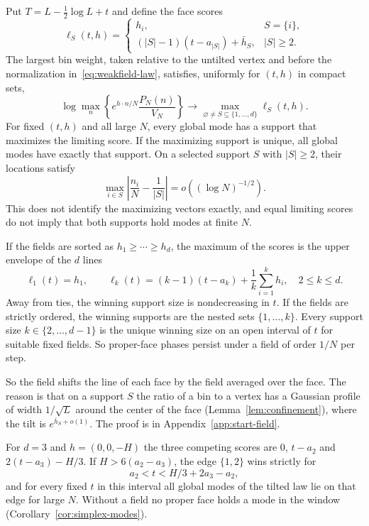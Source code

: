 \begin{theorem}\label{thm:weakfield-phases}
Put $T=L-\frac12\log L+t$ and define the face scores
\[
 \ell_S(t,h)=
 \begin{cases}
 h_i,& S=\{i\},\\
 (|S|-1)(t-a_{|S|})+\bar h_S,& |S|\ge2.
 \end{cases}
\]
The largest bin weight, taken relative to the untilted vertex and before the
normalization in~\eqref{eq:weakfield-law}, satisfies, uniformly for $(t,h)$ in
compact sets,
\begin{equation}\label{eq:weakfield-maximum}
 \log\max_n\left\{e^{h\cdot n/N}\frac{P_N(n)}{V_N}\right\}
 \longrightarrow \max_{\varnothing\ne S\subseteq\{1,\ldots,d\}}
 \ell_S(t,h).
\end{equation}
For fixed $(t,h)$ and all large $N$, every global mode has a support that
maximizes the limiting score. If the maximizing support is unique, all global
modes have exactly that support. On a selected support $S$ with $|S|\ge2$,
their locations satisfy
\[
 \max_{i\in S}\left|\frac{n_i}{N}-\frac1{|S|}\right|=o((\log N)^{-1/2}).
\]
This does not identify the maximizing vectors exactly, and equal limiting
scores do not imply that both supports hold modes at finite $N$.

If the fields are sorted as $h_1\ge\cdots\ge h_d$, the maximum of the scores is
the upper envelope of the $d$ lines
\begin{equation}\label{eq:weakfield-lines}
 \ell_1(t)=h_1,\qquad
 \ell_k(t)=(k-1)(t-a_k)+\frac1k\sum_{i=1}^k h_i,
 \quad 2\le k\le d.
\end{equation}
Away from ties, the winning support size is nondecreasing in $t$. If the fields
are strictly ordered, the winning supports are the nested sets
$\{1,\ldots,k\}$. Every support size $k\in\{2,\ldots,d-1\}$ is the unique
winning size on an open interval of $t$ for suitable fixed fields. So
proper-face phases persist under a field of order $1/N$ per step.
\end{theorem}

So the field shifts the line of each face by the field averaged over the face.
The reason is that on a support $S$ the ratio of a bin to a vertex has a Gaussian profile of
width $1/\sqrt L$ around the center of the face (Lemma~\ref{lem:confinement}),
where the tilt is $e^{\bar h_S+o(1)}$. The proof is in
Appendix~\ref{app:start-field}.

\begin{example}\label{ex:weakfield-triangle}
For $d=3$ and $h=(0,0,-H)$ the three competing scores are $0$, $t-a_2$ and
$2(t-a_3)-H/3$. If $H>6(a_2-a_3)$, the edge $\{1,2\}$ wins strictly for
\[
 a_2<t<H/3+2a_3-a_2,
\]
and for every fixed $t$ in this interval all global modes of the tilted law lie
on that edge for large $N$. Without a field no proper face holds a mode in the
window (Corollary~\ref{cor:simplex-modes}).
\end{example}


